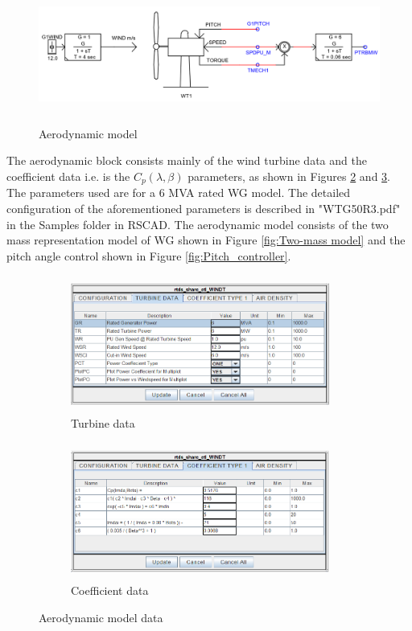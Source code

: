 \begin{figure}[]
\centering
    \includegraphics[height = 4.5cm,width = 15.5cm]{Diagrams/Appendix_A/Aerodynamic_model.PNG}
    \caption{Aerodynamic model}
    \label{fig:Aerodynamic_model}
\end{figure}

The aerodynamic block consists mainly of the wind turbine data and the coefficient data i.e. is the $C_p(\lambda,\beta)$ parameters, as shown in Figures \ref{fig:Turbine_data} and \ref{fig:Coeff_type}. The parameters used are for a 6 MVA rated \gls{WG} model. The detailed configuration of the aforementioned parameters is described in "WTG50R3.pdf" in the Samples folder in RSCAD. The aerodynamic model consists of the two mass representation model of \gls{WG} shown in Figure \ref{fig:Two-mass model} and the pitch angle control shown in Figure \ref{fig:Pitch_controller}. 

\begin{figure}[H]
\centering
\begin{subfigure}{.55\textwidth}
  \centering
  \includegraphics[height=4.5cm,width=8.5cm]{Diagrams/Appendix_A/Turbine_data.PNG}
  \caption{Turbine data}
  \label{fig:Turbine_data}
\end{subfigure}%
\begin{subfigure}{.45\textwidth}
  \centering
  \includegraphics[height=4.5cm,width=8.5cm]{Diagrams/Appendix_A/Coeff_type.PNG}
  \caption{Coefficient data}
  \label{fig:Coeff_type}
\end{subfigure}
\caption{Aerodynamic model data}
\label{fig:aerodynamic_model_data}
\end{figure}

